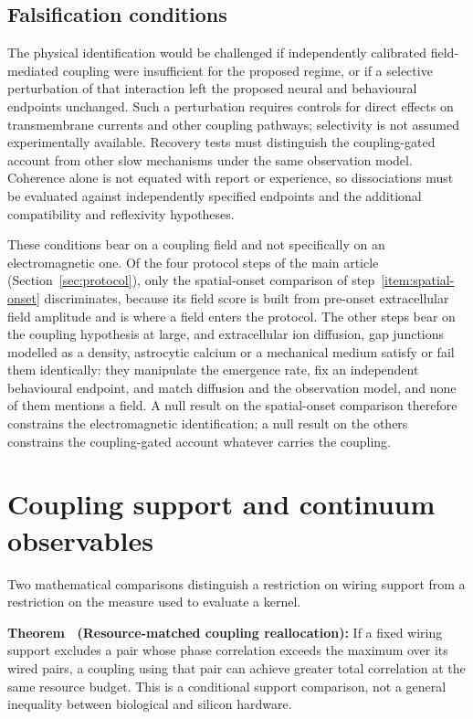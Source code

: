 \documentclass{article}
\begin{document}
\subsection{Falsification conditions}

The physical identification would be challenged if independently calibrated field-mediated coupling were insufficient for the proposed regime, or if a selective perturbation of that interaction left the proposed neural and behavioural endpoints unchanged. Such a perturbation requires controls for direct effects on transmembrane currents and other coupling pathways; selectivity is not assumed experimentally available. Recovery tests must distinguish the coupling-gated account from other slow mechanisms under the same observation model. Coherence alone is not equated with report or experience, so dissociations must be evaluated against independently specified endpoints and the additional compatibility and reflexivity hypotheses.

These conditions bear on a coupling field and not specifically on an electromagnetic one. Of the four protocol steps of the main article (Section~\ref{sec:protocol}), only the spatial-onset comparison of step~\ref{item:spatial-onset} discriminates, because its field score is built from pre-onset extracellular field amplitude and is where a field enters the protocol. The other steps bear on the coupling hypothesis at large, and extracellular ion diffusion, gap junctions modelled as a density, astrocytic calcium or a mechanical medium satisfy or fail them identically: they manipulate the emergence rate, fix an independent behavioural endpoint, and match diffusion and the observation model, and none of them mentions a field. A null result on the spatial-onset comparison therefore constrains the electromagnetic identification; a null result on the others constrains the coupling-gated account whatever carries the coupling.

\section{Coupling support and continuum observables}
\label{sec:supp-support}
Two mathematical comparisons distinguish a restriction on wiring support from a restriction on the measure used to evaluate a kernel.

\label{thm:supp-support}
\textbf{Theorem \thesuppresult\ (Resource-matched coupling reallocation):} If a fixed wiring support excludes a pair whose phase correlation exceeds the maximum over its wired pairs, a coupling using that pair can achieve greater total correlation at the same resource budget. This is a conditional support comparison, not a general inequality between biological and silicon hardware.
\end{document}
